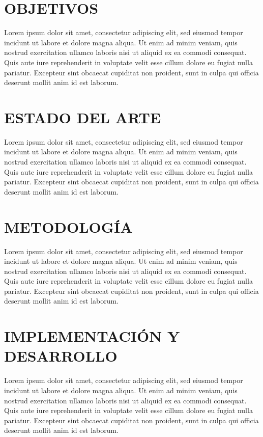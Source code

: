 \documentclass[12pt,a4paper,twoside]{article} %
\begin{document}
\section{OBJETIVOS}
Lorem ipsum dolor sit amet, consectetur adipiscing elit, sed eiusmod tempor incidunt ut labore et dolore magna aliqua. Ut enim ad minim veniam, quis nostrud exercitation ullamco laboris nisi ut aliquid ex ea commodi consequat. Quis aute iure reprehenderit in voluptate velit esse cillum dolore eu fugiat nulla pariatur. Excepteur sint obcaecat cupiditat non proident, sunt in culpa qui officia deserunt mollit anim id est laborum.

\section{ESTADO DEL ARTE}
Lorem ipsum dolor sit amet, consectetur adipiscing elit, sed eiusmod tempor incidunt ut labore et dolore magna aliqua. Ut enim ad minim veniam, quis nostrud exercitation ullamco laboris nisi ut aliquid ex ea commodi consequat. Quis aute iure reprehenderit in voluptate velit esse cillum dolore eu fugiat nulla pariatur. Excepteur sint obcaecat cupiditat non proident, sunt in culpa qui officia deserunt mollit anim id est laborum.

\section{METODOLOGÍA}
Lorem ipsum dolor sit amet, consectetur adipiscing elit, sed eiusmod tempor incidunt ut labore et dolore magna aliqua. Ut enim ad minim veniam, quis nostrud exercitation ullamco laboris nisi ut aliquid ex ea commodi consequat. Quis aute iure reprehenderit in voluptate velit esse cillum dolore eu fugiat nulla pariatur. Excepteur sint obcaecat cupiditat non proident, sunt in culpa qui officia deserunt mollit anim id est laborum.

\section{IMPLEMENTACIÓN Y DESARROLLO}
Lorem ipsum dolor sit amet, consectetur adipiscing elit, sed eiusmod tempor incidunt ut labore et dolore magna aliqua. Ut enim ad minim veniam, quis nostrud exercitation ullamco laboris nisi ut aliquid ex ea commodi consequat. Quis aute iure reprehenderit in voluptate velit esse cillum dolore eu fugiat nulla pariatur. Excepteur sint obcaecat cupiditat non proident, sunt in culpa qui officia deserunt mollit anim id est laborum.
\end{document}
